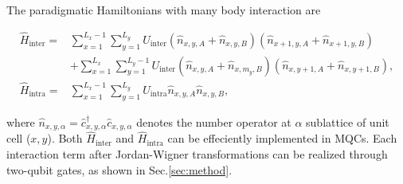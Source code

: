 \documentclass[longbibliography, aps, prx, amsmath, amssymb, amsfonts, twocolumn,superscriptaddress, footinbib]{revtex4-1}
\begin{document}
	The paradigmatic Hamiltonians with many body interaction are
	\begin{widetext}
		\begin{align}
			\hat{H}_{\text{inter}} = &\sum_{{x}=1}^{L_{x}-1} \sum_{{y}=1}^{L_{y}}  U_{\text{inter}} \left(\hat{n}_{{x}, {y}, A}+\hat{n}_{{x}, {y}, B}\right) \left(\hat{n}_{{x}+1, {y}, A}+\hat{n}_{{x}+1, {y}, B}\right)\\
			& + 
			\sum_{{x}=1}^{L_{x}} \sum_{{y}=1}^{L_{y}-1}  U_{\text{inter}} \left(\hat{n}_{{x}, {y}, A}+\hat{n}_{{x}, m_y, B}\right) \left(\hat{n}_{{x}, {y}+1, A}+\hat{n}_{{x}, {y}+1, B}\right),\\
			\hat{H}_{\text{intra}} =& \sum_{{x}=1}^{L_{x}-1} \sum_{{y}=1}^{L_{y}}  U_{\text{intra}} \hat{n}_{{x}, {y}, A} \hat{n}_{{x}, {y}, B},
		\end{align}
	\end{widetext}
	where $\hat{n}_{{x},{y},\alpha}=\hat{c}_{x,y,\alpha}^{\dagger}\hat{c}_{x,y,\alpha}$ denotes the number operator at $\alpha$ sublattice of unit cell (${x},{y}$).
	Both $\hat{H}_{\text{inter}}$ and $\hat{H}_{\text{intra}}$ can be effeciently implemented in MQCs. Each interaction term after Jordan-Wigner transformations can be realized through two-qubit gates, as shown in Sec.\ref{sec:method}.



\end{document}
